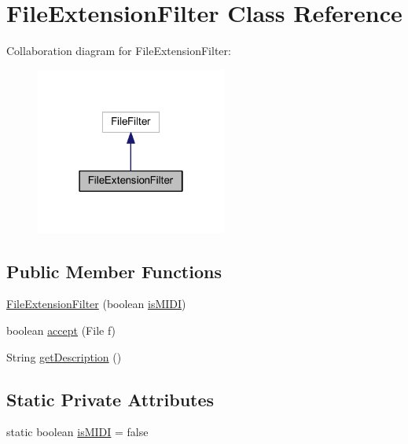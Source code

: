 \hypertarget{classcom_1_1lclion_1_1utils_1_1_file_extension_filter}{\section{File\+Extension\+Filter Class Reference}
\label{classcom_1_1lclion_1_1utils_1_1_file_extension_filter}
}


Collaboration diagram for File\+Extension\+Filter\+:\nopagebreak
\begin{figure}[H]
\begin{center}
\leavevmode
\includegraphics[width=178pt]{classcom_1_1lclion_1_1utils_1_1_file_extension_filter__coll__graph}
\end{center}
\end{figure}
\subsection*{Public Member Functions}
\begin{DoxyCompactItemize}
\item 
\hyperlink{classcom_1_1lclion_1_1utils_1_1_file_extension_filter_a971f3eb77d860e7e40f10ee2ec02bd7a}{File\+Extension\+Filter} (boolean \hyperlink{classcom_1_1lclion_1_1utils_1_1_file_extension_filter_af7a36d46741d21d3e94a00fd0983ff07}{is\+M\+I\+D\+I})
\item 
boolean \hyperlink{classcom_1_1lclion_1_1utils_1_1_file_extension_filter_ab4ef8d92d2363081b9e523ee48ea411c}{accept} (File f)
\item 
String \hyperlink{classcom_1_1lclion_1_1utils_1_1_file_extension_filter_ac7feffb7a33f63504ff1f87f19e2d2d8}{get\+Description} ()
\end{DoxyCompactItemize}
\subsection*{Static Private Attributes}
\begin{DoxyCompactItemize}
\item 
static boolean \hyperlink{classcom_1_1lclion_1_1utils_1_1_file_extension_filter_af7a36d46741d21d3e94a00fd0983ff07}{is\+M\+I\+D\+I} = false
\end{DoxyCompactItemize}


